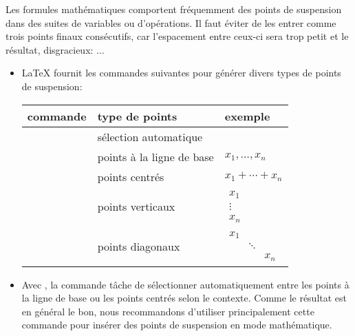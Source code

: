 Les formules mathématiques comportent fréquemment des points de
suspension dans des suites de variables ou d'opérations. Il faut
éviter de les entrer comme trois points finaux consécutifs, car
l'espacement entre ceux-ci sera trop petit et le résultat,
disgracieux: $...$

\begin{itemize}
\item {\LaTeX} fournit les commandes suivantes pour générer divers
  types de points de suspension:
\begin{center}
    \label{tab:math:espaces}
    \begin{tabular}{lll}
      \toprule
      commande & type de points & exemple \\
      \midrule
      \cmd{\dots} &  sélection automatique \\
      \cmd{\ldots} & points à la ligne de base & $x_1, \ldots, x_n$ \\
      \cmd{\cdots} & points centrés & $x_1 + \cdots + x_n$ \\
      \cmd{\vdots} & points verticaux & $
                                        \begin{matrix}
                                          x_1 \\ \vdots \\ x_n
                                        \end{matrix}$ \\
      \cmd{\ddots} & points diagonaux & $
                                        \begin{matrix}
                                          x_1 &&\\ &\ddots& \\ && x_n
                                        \end{matrix}$ \\
      \bottomrule
    \end{tabular}
  \end{center}
\item Avec , la commande \cmd{\dots} tâche de
  sélectionner automatiquement entre les points à la ligne de base ou
  les points centrés selon le contexte. Comme le résultat est en
  général le bon, nous recommandons d'utiliser principalement cette
  commande pour insérer des points de suspension en mode mathématique.
\end{itemize}
